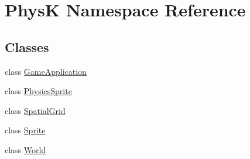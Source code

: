 \hypertarget{namespace_phys_k}{}\section{PhysK Namespace Reference}
\label{namespace_phys_k}
\subsection*{Classes}
\begin{DoxyCompactItemize}
\item 
class \hyperlink{class_phys_k_1_1_game_application}{Game\+Application}
\item 
class \hyperlink{class_phys_k_1_1_physics_sprite}{Physics\+Sprite}
\item 
class \hyperlink{class_phys_k_1_1_spatial_grid}{Spatial\+Grid}
\item 
class \hyperlink{class_phys_k_1_1_sprite}{Sprite}
\item 
class \hyperlink{class_phys_k_1_1_world}{World}
\end{DoxyCompactItemize}

